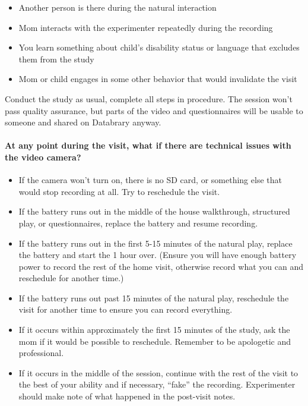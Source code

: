 \documentclass[
  12pt,
]{book}
\providecommand{\tightlist}{%
  \setlength{\itemsep}{0pt}\setlength{\parskip}{0pt}}
\begin{document}
\begin{itemize}
\tightlist
\item
  Another person is there during the natural interaction
\item
  Mom interacts with the experimenter repeatedly during the recording
\item
  You learn something about child's disability status or language that excludes them from the study
\item
  Mom or child engages in some other behavior that would invalidate the visit
\end{itemize}

Conduct the study as usual, complete all steps in procedure. The session won't pass quality assurance, but parts of the video and questionnaires will be usable to someone and shared on Databrary anyway.

\hypertarget{at-any-point-during-the-visit-what-if-there-are-technical-issues-with-the-video-camera}{%
\paragraph*{At any point during the visit, what if there are technical issues with the video camera?}\label{at-any-point-during-the-visit-what-if-there-are-technical-issues-with-the-video-camera}}

\begin{itemize}
\tightlist
\item
  If the camera won't turn on, there is no SD card, or something else that would stop recording at all. Try to reschedule the visit.
\item
  If the battery runs out in the middle of the house walkthrough, structured play, or questionnaires, replace the battery and resume recording.
\item
  If the battery runs out in the first 5-15 minutes of the natural play, replace the battery and start the 1 hour over. (Ensure you will have enough battery power to record the rest of the home visit, otherwise record what you can and reschedule for another time.)
\item
  If the battery runs out past 15 minutes of the natural play, reschedule the visit for another time to ensure you can record everything.
\item
  If it occurs within approximately the first 15 minutes of the study, ask the mom if it would be possible to reschedule. Remember to be apologetic and professional.\\
\item
  If it occurs in the middle of the session, continue with the rest of the visit to the best of your ability and if necessary, ``fake'' the recording. Experimenter should make note of what happened in the post-visit notes.
\end{itemize}
\end{document}
